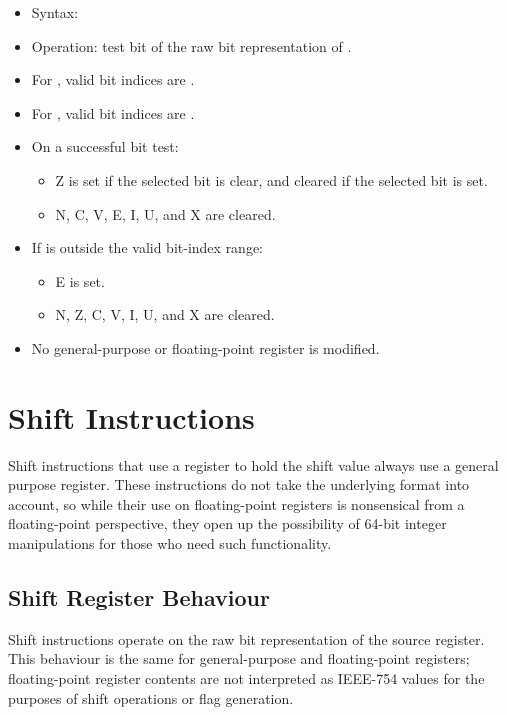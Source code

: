 \begin{itemize}
\item Syntax: 
\item Operation: test bit  of the raw bit representation of .
\item For , valid bit indices are .
\item For , valid bit indices are .
\item On a successful bit test:
      \begin{itemize}
      \item Z is set if the selected bit is clear, and cleared if the selected bit is set.
      \item N, C, V, E, I, U, and X are cleared.
      \end{itemize}
      \item If  is outside the valid bit-index range:
      \begin{itemize}
      \item E is set.
      \item N, Z, C, V, I, U, and X are cleared.
      \end{itemize}
\item No general-purpose or floating-point register is modified.
\end{itemize}

\section{Shift Instructions}

Shift instructions that use a register to hold the shift value always use a
general purpose register. These instructions do not take the underlying format
into account, so while their use on floating-point registers is nonsensical from
a floating-point perspective, they open up the possibility of 64-bit integer
manipulations for those who need such functionality.

\subsection{Shift Register Behaviour}

Shift instructions operate on the raw bit representation of the source
register. This behaviour is the same for general-purpose and floating-point
registers; floating-point register contents are not interpreted as IEEE-754
values for the purposes of shift operations or flag generation.


